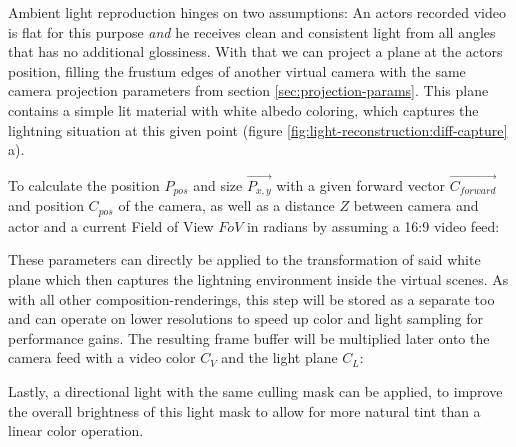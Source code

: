 Ambient light reproduction hinges on two assumptions: An actors recorded video 
is flat for this purpose \textit{and} he receives clean and consistent light 
from all angles that has no additional glossiness. With that we can project a 
plane at the actors position, filling the frustum edges of another virtual 
camera with the same camera projection parameters from section 
\ref{sec:projection-params}. This plane contains a simple lit material with 
white albedo coloring, which captures the lightning situation at this given 
point (figure \ref{fig:light-reconstruction:diff-capture} a).

To calculate the position $P_{pos}$ and size $\vec{P_{x, y}}$ with a 
given forward vector $\vec{C_{forward}}$ and position $C_{pos}$ of the 
camera, as well as a distance $Z$ between camera and actor and a current Field 
of View $FoV$ in radians by assuming a 16:9 video feed:



These parameters can directly be applied to the transformation of said white 
plane which then captures the lightning environment inside the virtual scenes. 
As with all other composition-renderings, this step will be stored as a 
separate  too and can operate on lower resolutions to speed 
up color and light sampling for performance gains.
\newline
The resulting frame buffer will be multiplied later onto the camera feed with a 
video color $C_V$ and the light plane $C_L$:


Lastly, a directional light with the same culling mask can be applied, to 
improve the overall brightness of this light mask to allow for more natural 
tint than a linear color operation.

